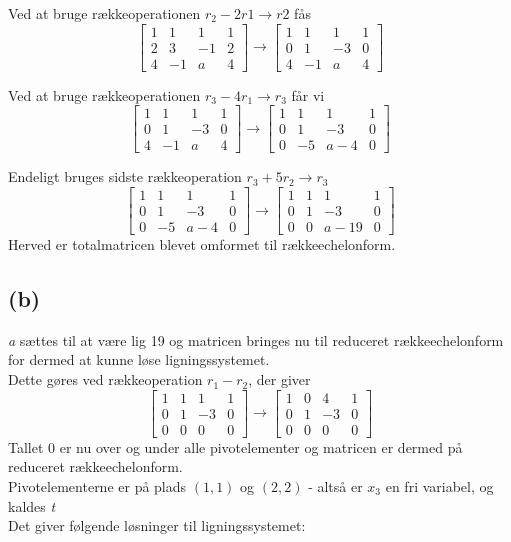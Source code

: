 \documentclass[12pt]{article}
\begin{document}
Ved at bruge rækkeoperationen $r_2-2r1 \to r2$ fås\\
$$
\left[\begin{array}{rrr|r}
1&1&1&1\\
2&3&-1&2\\
4&-1&a&4
\end{array}\right]
\to
\left[\begin{array}{rrr|r}
1&1&1&1\\
0&1&-3&0\\
4&-1&a&4
\end{array}\right]
$$

Ved at bruge rækkeoperationen $r_3-4r_1 \to r_3$ får vi\\ 
$$
\left[\begin{array}{rrr|r}
1&1&1&1\\
0&1&-3&0\\
4&-1&a&4
\end{array}\right]
\to
\left[\begin{array}{rrr|r}
1&1&1&1\\
0&1&-3&0\\
0&-5&a-4&0
\end{array}\right]
$$

Endeligt bruges sidste rækkeoperation $r_3+5r_2 \to r_3$ \\
$$
\left[\begin{array}{rrr|r}
1&1&1&1\\
0&1&-3&0\\
0&-5&a-4&0
\end{array}\right]
\to
\left[\begin{array}{rrr|r}
1&1&1&1\\
0&1&-3&0\\
0&0&a-19&0
\end{array}\right]
$$
Herved er totalmatricen blevet omformet til rækkeechelonform.\\

\subsection{(b)}
\textit{a} sættes til at være lig 19 og matricen bringes nu til reduceret rækkeechelonform for dermed at kunne løse ligningssystemet.\\
Dette gøres ved rækkeoperation $r_1-r_2$, der giver
$$
\left[\begin{array}{rrr|r}
1&1&1&1\\
0&1&-3&0\\
0&0&0&0
\end{array}\right]
\to
\left[\begin{array}{rrr|r}
1&0&4&1\\
0&1&-3&0\\
0&0&0&0
\end{array}\right]
$$
Tallet 0 er nu over og under alle pivotelementer og matricen er dermed på reduceret rækkeechelonform.\\
Pivotelementerne er på plads $(1,1)$ og $(2,2)$ - altså er $x_3$ en fri variabel, og kaldes \textit{t}\\
Det giver følgende løsninger til ligningssystemet: \\
\end{document}
